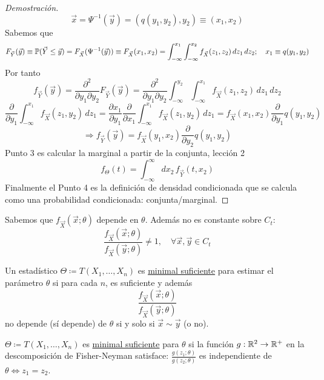 {\begin{proof}[Demostración]
$$\vec{x} = \Psi^{-1}(\vec{y}) = (q(y_1, y_2), y_2) \equiv (x_1, x_2)$$
Sabemos que
\[
  F_{\vec{Y}}(\vec{y}) \equiv \mathbb{P}(\vec{Y} \le \vec{y}) = F_{\vec{X}}(\Psi^{-1}(\vec{y})) \equiv F_{\vec{X}}(x_1, x_2)
  = \int_{-\infty}^{x_1} \int_{-\infty}^{x_2} f_{\vec{X}}(z_1, z_2)\,dz_1\,dz_2; \quad x_1 \equiv q(y_1, y_2)
\]
Por tanto
\[
  f_{\vec{Y}}(\vec{y}) = \frac{\partial^2}{\partial y_1 \partial y_2} F_{\vec{Y}}(\vec{y})
  = \frac{\partial^2}{\partial y_1 \partial y_2} \int_{-\infty}^{y_2} \int_{-\infty}^{x_1} f_{\vec{X}}(z_1, z_2)\,dz_1\,dz_2
\]
\[
  \frac{\partial}{\partial y_1} \int_{-\infty}^{x_1} f_{\vec{X}}(z_1, y_2)\,dz_1
  = \frac{\partial x_1}{\partial y_1} \frac{\partial}{\partial x_1} \int_{-\infty}^{x_1} f_{\vec{X}}(z_1, y_2)\,dz_1
  = f_{\vec{X}}(x_1, x_2) \frac{\partial}{\partial y_1} q(y_1, y_2)
\]
\[
  \Rightarrow f_{\vec{Y}}(\vec{y}) = f_{\vec{X}}(y_1, x_2) \frac{\partial}{\partial y_2} q(y_1, y_2)
\]
Punto 3 es calcular la marginal a partir de la conjunta, lección 2
\[
  f_{\Theta}(t) = \int_{-\infty}^{\infty} dx_2\, f_{\vec{Y}}(t, x_2)
\]
Finalmente el Punto 4 es la definición de densidad condicionada que se calcula como una probabilidad condicionada: conjunta/marginal.
\end{proof}}

\begin{observacion}[4]
Sabemos que $f_{\vec{X}}(\vec{x};\theta)$ depende en $\theta$. Además no es constante sobre $C_t$: 
$$\frac{f_{\vec{X}}(\vec{x};\theta)}{f_{\vec{X}}(\vec{y};\theta)} \neq 1, \quad \forall \vec{x}, \vec{y} \in C_t$$
\end{observacion}

\begin{definicion}[6]
Un estadístico $\Theta \coloneqq T(X_1, \dots, X_n)$ es \underline{minimal suficiente} para estimar el parámetro $\theta$ si para cada $n$, es suficiente y además 
$$\frac{f_{\vec{X}}(\vec{x};\theta)}{f_{\vec{X}}(\vec{y};\theta)}$$
no depende (s\'i depende) de $\theta$ si y solo si $\vec{x} \sim \vec{y}$ (o no).
\end{definicion}

\begin{corolario}
$\Theta \coloneqq T(X_1, \dots, X_n)$ es \underline{minimal suficiente} para $\theta$ si la función $g : \mathbb{R}^2 \to \mathbb{R}^+$ en la descomposición de Fisher-Neyman satisface: $\frac{g(z_1;\theta)}{g(z_2;\theta)}$ es independiente de $\theta \iff z_1 = z_2$.
\end{corolario}

